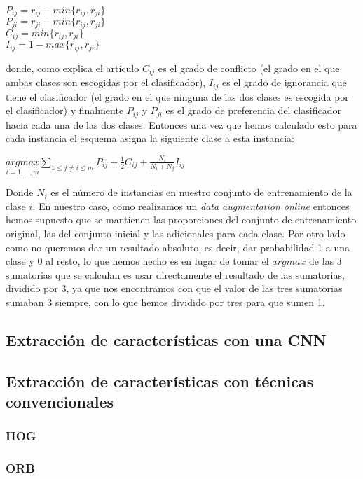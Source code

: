 \begin{center}
$P_{ij} = r_{ij} - min\lbrace r_{ij}, r_{ji} \rbrace$\\
$P_{ji} = r_{ji} - min \lbrace r_{ij}, r_{ji} \rbrace$\\
$C_{ij} = min\lbrace r_{ij}, r_{ji} \rbrace$\\
$I_{ij} = 1 - max\lbrace r_{ij}, r_{ji} \rbrace$
\end{center}

donde, como explica el artículo $C_{ij}$ es el grado de conflicto (el grado en el que ambas clases son escogidas por el clasificador), $I_{ij}$ es el grado de ignorancia que tiene el clasificador (el grado en el que ninguna de las dos clases es escogida por el clasificador) y finalmente $P_{ij}$ y $P_{ji}$ es el grado de preferencia del clasificador hacia cada una de las dos clases. Entonces una vez que hemos calculado esto para cada instancia el esquema asigna la siguiente clase a esta instancia:

\begin{center}
$\underset{i = 1,...,m}{argmax} \underset{1 \leq j \neq i \leq m}{\sum} P_{ij} + \frac{1}{2} C_{ij} + \frac{N_i}{N_i + N_j}I_{ij}$
\end{center}

Donde $N_i$ es el número de instancias en nuestro conjunto de entrenamiento de la clase $i$. En nuestro caso, como realizamos un \textit{data augmentation online} entonces hemos supuesto que se mantienen las proporciones del conjunto de entrenamiento original, las del conjunto inicial y las adicionales para cada clase. Por otro lado como no queremos dar un resultado absoluto, es decir, dar probabilidad 1 a una clase y 0 al resto, lo que hemos hecho es en lugar de tomar el $argmax$ de las 3 sumatorias que se calculan es usar directamente el resultado de las sumatorias, dividido por 3, ya que nos encontramos con que el valor de las tres sumatorias sumaban 3 siempre, con lo que hemos dividido por tres para que sumen 1.

\subsection{Extracción de características con una CNN}



\subsection{Extracción de características con técnicas convencionales}

\subsubsection{HOG}

\subsubsection{ORB}